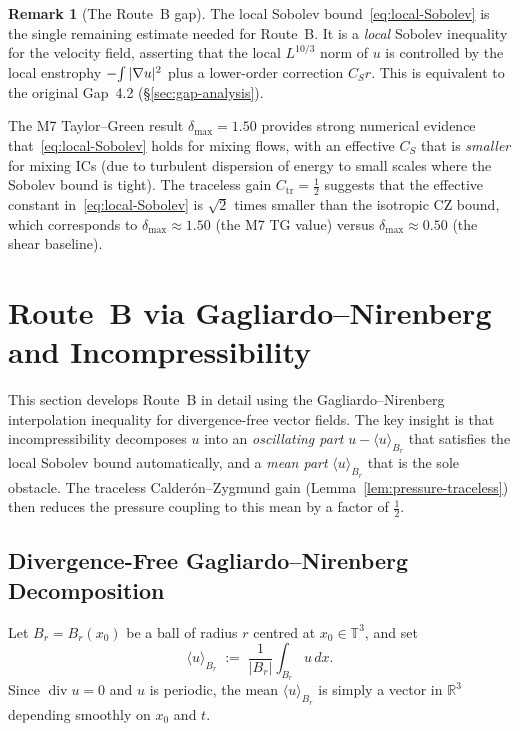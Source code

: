 \documentclass[11pt]{article}
\theoremstyle{definition}
\newtheorem{remark}[theorem]{Remark}
\theoremstyle{remark}
\newcommand{\R}{\mathbb{R}}
\newcommand{\T}{\mathbb{T}}
\newcommand{\Xint}{\mathop{\mathchoice{\vcenter{\hbox{$\displaystyle-$}}}%
  {\vcenter{\hbox{$\textstyle-$}}}%
  {\vcenter{\hbox{$\scriptstyle-$}}}%
  {\vcenter{\hbox{$\scriptscriptstyle-$}}}}\!\int}
\begin{document}
\begin{remark}[The Route~B gap]
\label{rem:route-B-gap}
  The local Sobolev bound~\eqref{eq:local-Sobolev} is the single remaining
  estimate needed for Route~B.  It is a \emph{local} Sobolev inequality
  for the velocity field, asserting that the local $L^{10/3}$ norm of $u$
  is controlled by the local enstrophy $\Xint|\nabla u|^2$ plus a lower-order
  correction $C_Sr$.  This is equivalent to the original Gap~4.2
  (§\ref{sec:gap-analysis}).

  The M7 Taylor--Green result $\delta_{\max}=1.50$ provides strong numerical
  evidence that~\eqref{eq:local-Sobolev} holds for mixing flows, with an
  effective $C_S$ that is \emph{smaller} for mixing ICs (due to turbulent
  dispersion of energy to small scales where the Sobolev bound is tight).
  The traceless gain $C_{\mathrm{tr}}=\tfrac{1}{2}$ suggests that the
  effective constant in~\eqref{eq:local-Sobolev} is $\sqrt{2}$ times
  smaller than the isotropic CZ bound, which corresponds to
  $\delta_{\max}\approx 1.50$ (the M7 TG value) versus $\delta_{\max}\approx0.50$
  (the shear baseline).
\end{remark}

\section{Route~B via Gagliardo--Nirenberg and Incompressibility}
\label{sec:route-b-gn}

This section develops Route~B in detail using the Gagliardo--Nirenberg interpolation
inequality for divergence-free vector fields.  The key insight is that
incompressibility decomposes $u$ into an \emph{oscillating part}
$u - \langle u\rangle_{B_r}$ that satisfies the local Sobolev bound automatically,
and a \emph{mean part} $\langle u\rangle_{B_r}$ that is the sole obstacle.
The traceless Calderón--Zygmund gain (Lemma~\ref{lem:pressure-traceless}) then
reduces the pressure coupling to this mean by a factor of $\tfrac{1}{2}$.

\subsection{Divergence-Free Gagliardo--Nirenberg Decomposition}

Let $B_r = B_r(x_0)$ be a ball of radius $r$ centred at $x_0\in\T^3$, and set
\[
  \langle u\rangle_{B_r} \;:=\; \frac{1}{|B_r|}\int_{B_r} u\,dx.
\]
Since $\operatorname{div} u = 0$ and $u$ is periodic, the mean $\langle u\rangle_{B_r}$
is simply a vector in $\R^3$ depending smoothly on $x_0$ and $t$.
\end{document}
